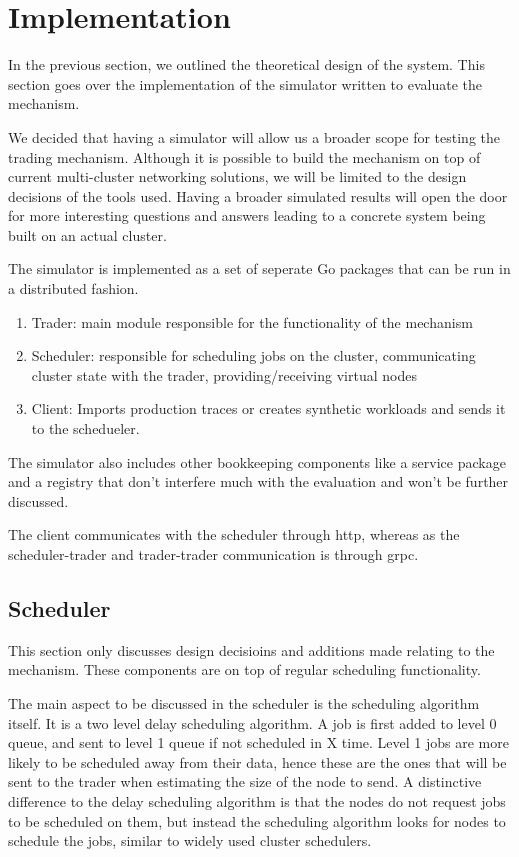 
\chapter{Implementation} 

In the previous section, we outlined the theoretical design of the system. This
section goes over the implementation of the simulator written to evaluate the
mechanism.

We decided that having a simulator will allow us a broader scope for testing
the trading mechanism. Although it is possible to build the mechanism on top of
current multi-cluster networking solutions, we will be limited to the design
decisions of the tools used. Having a broader simulated results will open the
door for more interesting questions and answers leading to a concrete system
being built on an actual cluster.

The simulator is implemented as a set of seperate Go packages that can be run
in a distributed fashion.
\begin{enumerate}
  \item Trader: main module responsible for the functionality of the mechanism
  \item Scheduler: responsible for scheduling jobs on the cluster,
    communicating cluster state with the trader, providing/receiving virtual
    nodes 
  \item Client: Imports production traces or creates synthetic workloads and
    sends it to the schedueler.
\end{enumerate}

The simulator also includes other bookkeeping components like a service package
and a registry that don't interfere much with the evaluation and won't be
further discussed.

The client communicates with the scheduler through http, whereas as the
scheduler-trader and trader-trader communication is through grpc. 

\section{Scheduler} 

This section only discusses design decisioins and additions made relating to
the mechanism. These components are on top of regular scheduling functionality. 

The main aspect to be discussed in the scheduler is the scheduling algorithm
itself. It is a two level delay scheduling algorithm. A job is first added to
level 0 queue, and sent to level 1 queue if not scheduled in X time. Level 1
jobs are more likely to be scheduled away from their data, hence these are the
ones that will be sent to the trader when estimating the size of the node to
send. A distinctive difference to the delay scheduling algorithm is that the
nodes do not request jobs to be scheduled on them, but instead the scheduling
algorithm looks for nodes to schedule the jobs, similar to widely used cluster
schedulers.

